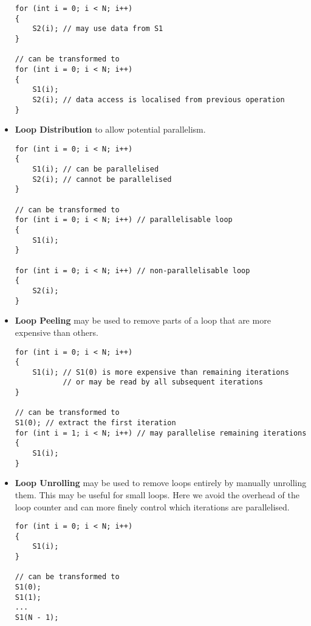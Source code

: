 \documentclass{article}
\begin{document}
\begin{itemize}
\begin{verbatim}
for (int i = 0; i < N; i++)
{
    S2(i); // may use data from S1
}

// can be transformed to
for (int i = 0; i < N; i++)
{
    S1(i);
    S2(i); // data access is localised from previous operation
}
\end{verbatim}
    \item \textbf{Loop Distribution} to allow potential parallelism.
          \begin{verbatim}
for (int i = 0; i < N; i++)
{
    S1(i); // can be parallelised
    S2(i); // cannot be parallelised
}

// can be transformed to
for (int i = 0; i < N; i++) // parallelisable loop
{
    S1(i);
}

for (int i = 0; i < N; i++) // non-parallelisable loop
{
    S2(i);
}
\end{verbatim}
    \item \textbf{Loop Peeling} may be used to remove parts of a loop
          that are more expensive than others.
          \begin{verbatim}
for (int i = 0; i < N; i++)
{
    S1(i); // S1(0) is more expensive than remaining iterations
           // or may be read by all subsequent iterations
}

// can be transformed to
S1(0); // extract the first iteration
for (int i = 1; i < N; i++) // may parallelise remaining iterations
{
    S1(i);
}
\end{verbatim}
    \item \textbf{Loop Unrolling} may be used to remove loops entirely
          by manually unrolling them. This may be useful for small loops.
          Here we avoid the overhead of the loop counter and can more finely
          control which iterations are parallelised.
          \begin{verbatim}
for (int i = 0; i < N; i++)
{
    S1(i);
}

// can be transformed to
S1(0);
S1(1);
...
S1(N - 1);
\end{verbatim}
\end{itemize}
\end{document}
